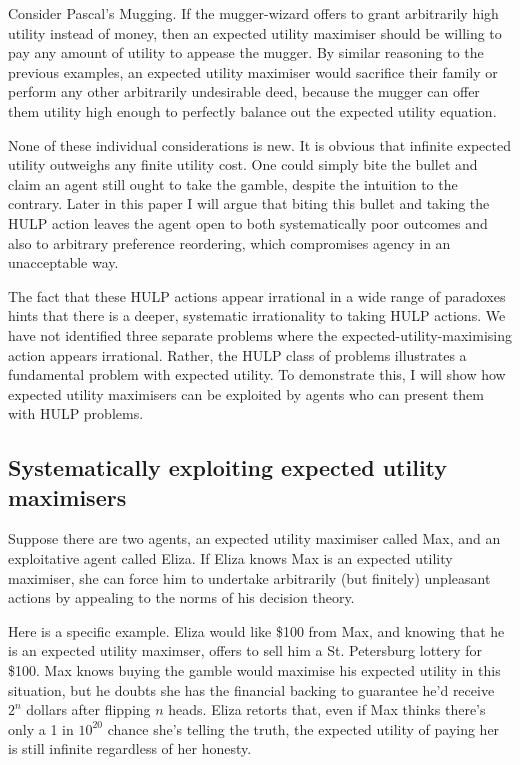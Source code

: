 \documentclass{article}
\begin{document}
Consider Pascal's Mugging. If the mugger-wizard offers to grant arbitrarily high utility instead of money, then an expected utility maximiser should be willing to pay any amount of utility to appease the mugger. By similar reasoning to the previous examples, an expected utility maximiser would sacrifice their family or perform any other arbitrarily undesirable deed, because the mugger can offer them utility high enough to perfectly balance out the expected utility equation.

None of these individual considerations is new. It is obvious that infinite expected utility outweighs any finite utility cost. One could simply bite the bullet and claim an agent still ought to take the gamble, despite the intuition to the contrary. Later in this paper I will argue that biting this bullet and taking the HULP action leaves the agent open to both systematically poor outcomes and also to arbitrary preference reordering, which compromises agency in an unacceptable way.

The fact that these HULP actions appear irrational in a wide range of paradoxes hints that there is a deeper, systematic irrationality to taking HULP actions. We have not identified three separate problems where the expected-utility-maximising action appears irrational. Rather, the HULP class of problems illustrates a fundamental problem with expected utility. To demonstrate this, I will show how expected utility maximisers can be exploited by agents who can present them with HULP problems.

\subsection{Systematically exploiting expected utility maximisers}

Suppose there are two agents, an expected utility maximiser called Max, and an exploitative agent called Eliza. If Eliza knows Max is an expected utility maximiser, she can force him to undertake arbitrarily (but finitely) unpleasant actions by appealing to the norms of his decision theory. 

Here is a specific example. Eliza would like \$100 from Max, and knowing that he is an expected utility maximser, offers to sell him a St. Petersburg lottery for \$100. Max knows buying the gamble would maximise his expected utility in this situation, but he doubts she has the financial backing to guarantee he'd receive \(2^n\) dollars after flipping \(n\) heads. Eliza retorts that, even if Max thinks there's only a 1 in \(10^{20}\) chance she's telling the truth, the expected utility of paying her is still infinite regardless of her honesty.
\end{document}
